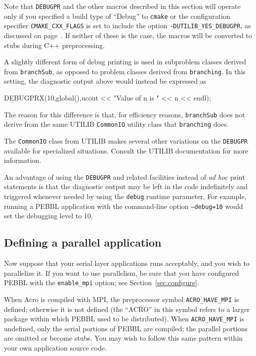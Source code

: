 Note that \texttt{DEBUGPR} and the other macros described in this section will
operate only if you specified a build type of ``Debug'' to \texttt{cmake} or
the configuration specifier \texttt{CMAKE\_CXX\_FLAGS} is set to
include the option \texttt{-DUTILIB\_YES\_DEBUGPR}, as discussed on
page~\pageref{advancedoptions}.  If neither of these is the case, the macros will be
converted to stubs during C++ preprocessing.

A slightly different form of debug printing is used in subproblem
classes derived from \texttt{branchSub}, as opposed to problem classes
derived from \texttt{branching}.  In this setting, the diagnostic
output above would instead be expressed as
\begin{codeblock}
DEBUGPRX(10,global(),ucout << "Value of n is " << n << endl);
\end{codeblock}
The reason for this difference is that, for efficiency reasons,
\texttt{branchSub} does not derive from the same UTILIB
\texttt{CommonIO} utility class that \texttt{branching} does.  

The \texttt{CommonIO} class from UTILIB makes several other variations
on the \texttt{DEBUGPR} available for specialized situations.  Consult
the UTILIB documentation for more information.

An advantage of using the \texttt{DEBUGPR} and related facilities
instead of \emph{ad hoc} print statements is that the diagnostic
output may be left in the code indefinitely and triggered whenever
needed by using the \texttt{debug} runtime parameter.  For example,
running a PEBBL application with the command-line option
\texttt{--debug=10} would set the debugging level to 10.  

\subsection{Defining a parallel application}
\label{sec:parMethods}
Now suppose that your serial layer applications runs acceptably, and you wish
to parallelize it.  If you want to use parallelism, be sure that you have
configured PEBBL with the \texttt{enable\_mpi} option; see
Section~\ref{sec:configure}.

When Acro is compiled with MPI, the preprocessor symbol
\texttt{ACRO\_HAVE\_MPI} is defined; otherwise it is not defined (the ``ACRO''
in this symbol refers to a larger package within which PEBBL used to be
distributed). When \texttt{ACRO\_HAVE\_MPI} is undefined, only the serial
portions of PEBBL are compiled; the parallel portions are omitted or become
stubs.  You may wish to follow this same pattern within your own application
source code.

